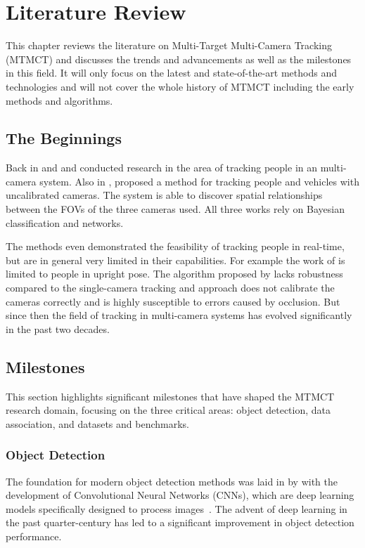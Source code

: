 \chapter{Literature Review}\label{chap:literature_review}
This chapter reviews the literature on Multi-Target Multi-Camera Tracking (MTMCT) and discusses the trends and advancements as well as the milestones in this field. It will only focus on the latest and state-of-the-art methods and technologies and will not cover the whole history of MTMCT including the early methods and algorithms.

\section{The Beginnings}\label{sec:the_beginnings}
Back in \citeyear{Cai99} and \citeyear{Chang01} \textcite{Cai99} and \textcite{Chang01} conducted research in the area of tracking people in an multi-camera system. Also in \citeyear{Khan01}, \textcite{Khan01} proposed a method for tracking people and vehicles with uncalibrated cameras. The system is able to discover spatial relationships between the FOVs of the three cameras used. All three works rely on Bayesian classification and networks. %

The methods even demonstrated the feasibility of tracking people in real-time, but are in general very limited in their capabilities. For example the work of \citeauthor{Chang01} is limited to people in upright pose. The algorithm proposed by \citeauthor{Cai99} lacks robustness compared to the single-camera tracking and \citeauthor{Khan01} approach does not calibrate the cameras correctly and is highly susceptible to errors caused by occlusion. But since then the field of tracking in multi-camera systems has evolved significantly in the past two decades.

\section{Milestones}\label{sec:milestones}
This section highlights significant milestones that have shaped the MTMCT research domain, focusing on the three critical areas: object detection, data association, and datasets and benchmarks.

\subsection{Object Detection}\label{subsec:object_detection}
The foundation for modern object detection methods was laid in \citeyear{Lecun98} by \citeauthor{Lecun98} with the development of Convolutional Neural Networks (CNNs), which are deep learning models specifically designed to process images~\cite{Lecun98}. The advent of deep learning in the past quarter-century has led to a significant improvement in object detection performance.

